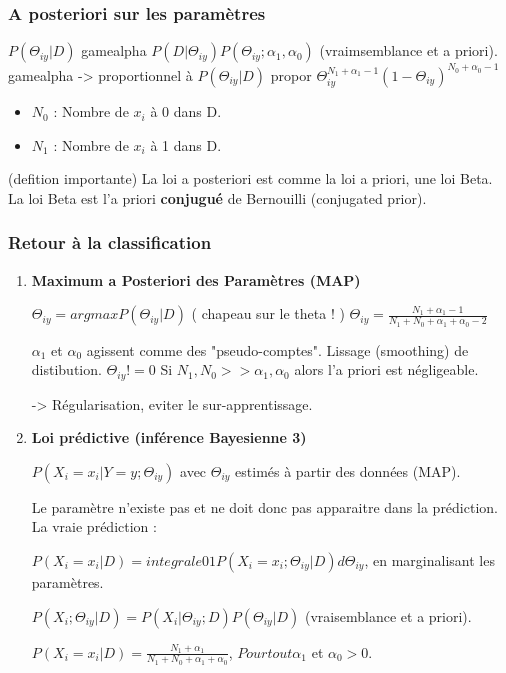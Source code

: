 \documentclass{article}
\begin{document}
\subsubsection{A posteriori sur les paramètres}

$ P(\Theta_{iy} | D)$ gamealpha $P(D | \Theta_{iy}) P(\Theta_{iy}; \alpha_1, \alpha_0)$ (vraimsemblance et a priori).
gamealpha -> proportionnel à
$ P(\Theta_{iy} | D)$ propor $\Theta_{iy}^{N_1 + \alpha_1 - 1} (1 - \Theta_{iy})^{N_0 + \alpha_0 - 1}$

\begin{itemize}
\item $N_0$ : Nombre de $x_i$ à 0 dans D.
\item $N_1$ : Nombre de $x_i$ à 1 dans D.
\end{itemize}

(defition importante)
La loi a posteriori est comme la loi a priori, une loi Beta. La loi Beta est l'a priori \textbf{conjugué} de Bernouilli (conjugated prior).

\subsubsection{Retour à la classification}

\begin{enumerate}

\item \textbf{Maximum a Posteriori des Paramètres (MAP)}

$ \Theta_{iy} = argmax P(\Theta_{iy} | D) $ ( chapeau sur le theta ! )
$ \Theta_{iy} = \frac{N_1 + \alpha_1 - 1}{N_1 + N_0 + \alpha_1 + \alpha_0 - 2} $

$\alpha_1$ et $\alpha_0$ agissent comme des "pseudo-comptes". Lissage (smoothing) de distibution.
$\Theta_{iy} != 0$
Si $N_1, N_0 >> \alpha_1, \alpha_0$ alors l'a priori est négligeable.

-> Régularisation, eviter le sur-apprentissage.

\item \textbf{Loi prédictive (inférence Bayesienne 3)}

$P(X_i = x_i | Y = y; \Theta_{iy})$ avec $\Theta_{iy}$ estimés à partir des données (MAP).

Le paramètre n'existe pas et ne doit donc pas apparaitre dans la prédiction. La vraie prédiction :

$P(X_i = x_i | D) = integrale01 P(X_i = x_i; \Theta_{iy} | D) d \Theta_{iy}$, en marginalisant les paramètres.

$P(X_i; \Theta_{iy} | D) = P(X_i | \Theta_{iy}; D) P(\Theta_{iy} | D)$ (vraisemblance et a priori).

$ P(X_i = x_i | D) = \frac{N_1 + \alpha_1}{N_1 + N_0 + \alpha_1 + \alpha_0}$, $Pourtout \alpha_1$ et $\alpha_0 > 0$.

\end{enumerate}
\end{document}

